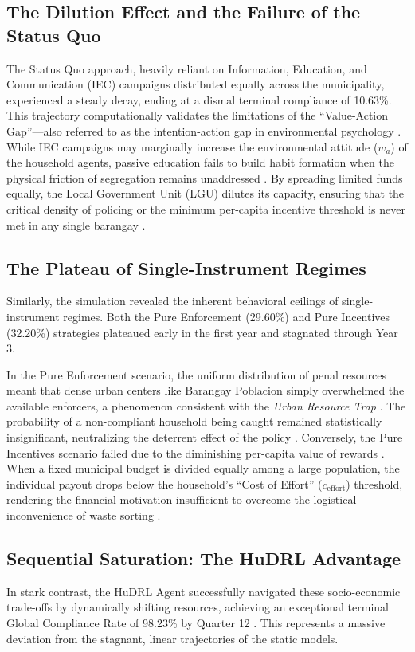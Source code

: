 \subsection{The Dilution Effect and the Failure of the Status Quo}
The Status Quo approach, heavily reliant on Information, Education, and Communication (IEC) campaigns distributed equally across the municipality, experienced a steady decay, ending at a dismal terminal compliance of 10.63\%. This trajectory computationally validates the limitations of the ``Value-Action Gap''---also referred to as the intention-action gap in environmental psychology \citep{Geiger2021, Liao2024}. While IEC campaigns may marginally increase the environmental attitude ($w_a$) of the household agents, passive education fails to build habit formation when the physical friction of segregation remains unaddressed \citep{Moeini2023, Yazawa2025}. By spreading limited funds equally, the Local Government Unit (LGU) dilutes its capacity, ensuring that the critical density of policing or the minimum per-capita incentive threshold is never met in any single barangay \citep{Alphonso2024}. 

\subsection{The Plateau of Single-Instrument Regimes}
Similarly, the simulation revealed the inherent behavioral ceilings of single-instrument regimes. Both the Pure Enforcement (29.60\%) and Pure Incentives (32.20\%) strategies plateaued early in the first year and stagnated through Year 3. 

In the Pure Enforcement scenario, the uniform distribution of penal resources meant that dense urban centers like Barangay Poblacion simply overwhelmed the available enforcers, a phenomenon consistent with the \textit{Urban Resource Trap} \citep{Villanueva2021}. The probability of a non-compliant household being caught remained statistically insignificant, neutralizing the deterrent effect of the policy \citep{Badua2022}. Conversely, the Pure Incentives scenario failed due to the diminishing per-capita value of rewards \citep{MuZhang2021}. When a fixed municipal budget is divided equally among a large population, the individual payout drops below the household's ``Cost of Effort'' ($c_{\text{effort}}$) threshold, rendering the financial motivation insufficient to overcome the logistical inconvenience of waste sorting \citep{Chen2023, Corcoran2020}.

\subsection{Sequential Saturation: The HuDRL Advantage}
In stark contrast, the HuDRL Agent successfully navigated these socio-economic trade-offs by dynamically shifting resources, achieving an exceptional terminal Global Compliance Rate of 98.23\% by Quarter 12 \citep{Dey2025, ZhengAI2022}. This represents a massive deviation from the stagnant, linear trajectories of the static models. 

